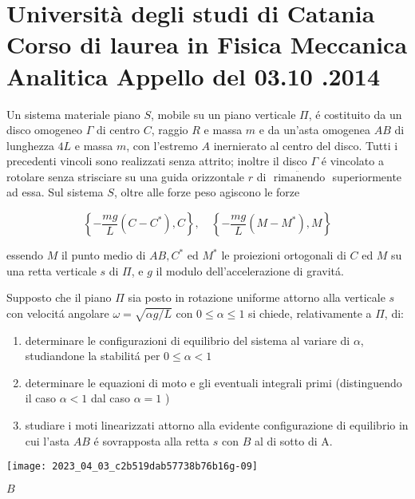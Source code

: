 \documentclass[10pt]{article}
\begin{document}
\section{Università degli studi di Catania
Corso di laurea in Fisica
Meccanica Analitica
Appello del 03.10 .2014}
Un sistema materiale piano \(S\), mobile su un piano verticale \(\Pi\), é costituito da un disco omogeneo \(\Gamma\) di centro \(C\), raggio \(R\) e massa \(m\) e da un'asta omogenea \(A B\) di lunghezza \(4 L\) e massa \(m\), con l'estremo \(A\) inernierato al centro del disco. Tutti i precedenti vincoli sono realizzati senza attrito; inoltre il disco \(\Gamma\) é vincolato a rotolare senza strisciare su una guida orizzontale \(r\) di \(\ddot{\text { rimanendo }}\) superiormente ad essa. Sul sistema \(S\), oltre alle forze peso agiscono le forze

\[
\left\{-\frac{m g}{L}\left(C-C^{*}\right), C\right\}, \quad\left\{-\frac{m g}{L}\left(M-M^{*}\right), M\right\}
\]

essendo \(M\) il punto medio di \(A B, C^{*}\) ed \(M^{*}\) le proiezioni ortogonali di \(C\) ed \(M\) su una retta verticale \(s\) di \(\Pi\), e \(g\) il modulo dell'accelerazione di gravitá.

Supposto che il piano \(\Pi\) sia posto in rotazione uniforme attorno alla verticale \(s\) con velocitá angolare \(\omega=\sqrt{\alpha g / L}\) con \(0 \leq \alpha \leq 1\) si chiede, relativamente a \(\Pi\), di:

\begin{enumerate}
  \item determinare le configurazioni di equilibrio del sistema al variare di \(\alpha\), studiandone la stabilitá per \(0 \leq \alpha<1\)

  \item determinare le equazioni di moto e gli eventuali integrali primi (distinguendo il caso \(\alpha<1\) dal caso \(\alpha=1\) )

  \item studiare i moti linearizzati attorno alla evidente configurazione di equilibrio in cui l'asta \(A B\) é sovrapposta alla retta \(s\) con \(B\) al di sotto di A.

\end{enumerate}

\begin{center}
\texttt{[image: 2023\_04\_03\_c2b519dab57738b76b16g-09]}
\end{center}

\(B\)
\end{document}
